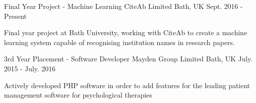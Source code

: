 


\begin{cventries}


\cventry
{Final Year Project - Machine Learning} %
{CiteAb Limited} %
{Bath, UK} %
{Sept. 2016 - Present} %
{ %
\begin{cvitems}
\item {Final year project at Bath University, working with CiteAb to create a machine learning system capable of recognising institution names in research papers.}
\end{cvitems}
}


\cventry
{3rd Year Placement - Software Developer} %
{Mayden Group Limited} %
{Bath, UK} %
{July. 2015 - July. 2016} %
{ %
\begin{cvitems}
\item {Actively developed PHP software in order to add features for the leading patient management software for psychological therapies}
\end{cvitems}
}




\end{cventries}